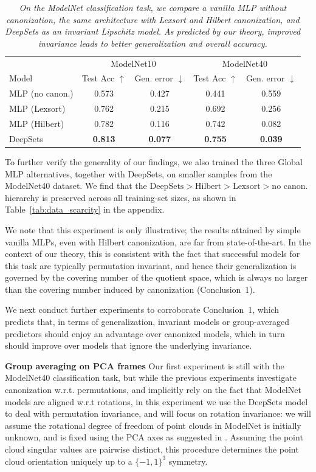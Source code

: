 \begin{table}[h]
\centering
\caption{\it On the ModelNet classification task, we compare a vanilla MLP without canonization, the same architecture with Lexsort and Hilbert canonization, and DeepSets as an invariant Lipschitz model. As predicted by our theory, improved invariance leads to better generalization and overall accuracy.}
\label{tab:best_modelnet10and40}
\begin{tabular}{lcccc}
\hline
 & \multicolumn{2}{c}{ModelNet10} & \multicolumn{2}{c}{ModelNet40} \\
Model & Test Acc $\uparrow$ & Gen. error $\downarrow$ & Test Acc $\uparrow$ & Gen. error $\downarrow$ \\
\hline
MLP (no canon.) & 0.573 & 0.427 & 0.441 & 0.559 \\
MLP (Lexsort)   & 0.762 & 0.215 & 0.692 & 0.256 \\
MLP (Hilbert)   & 0.782 & 0.116 & 0.742 & 0.082 \\
DeepSets        & \textbf{0.813} & \textbf{0.077} & \textbf{0.755} & \textbf{0.039} \\
\hline
\end{tabular}
\end{table}

To further verify the generality of our findings, we also trained the three Global MLP alternatives, together with DeepSets, on smaller samples from the ModelNet40 dataset. We find that the $\text{DeepSets}>\text{Hilbert}>\text{Lexsort}>\text{no canon.}$ hierarchy is preserved across all training-set sizes, as shown in Table~\ref{tab:data_scarcity} in the appendix.

We note that this experiment is only illustrative; the results attained by simple vanilla MLPs, even with Hilbert canonization, are far from state-of-the-art. In the context of our theory, this is consistent with the fact that successful models for this task are typically permutation invariant, and hence their generalization is governed by the covering number of the quotient space, which is always no larger than the covering number induced by canonization (Conclusion~1).

We next conduct further experiments to corroborate Conclusion~1, which predicts that, in terms of generalization, invariant models or group-averaged predictors should enjoy an advantage over canonized models, which in turn should improve over models that ignore the underlying invariance.

\textbf{Group averaging on PCA frames} Our first experiment is still with the ModelNet40 classification task, but while the previous experiments investigate canonization w.r.t. permutations, and implicitly rely on the fact that ModelNet models are aligned w.r.t rotations, in this experiment we use the  DeepSets \cite{zaheer2017deep} model to deal with permutation invariance, and will focus on rotation invariance: we will assume the rotational degree of freedom of point clouds in ModelNet is initially unknown, and is fixed using the PCA axes as suggested in \cite{punyframe}. Assuming the point cloud singular values are pairwise distinct, this procedure determines the point cloud orientation uniquely up to a $\{-1,1\}^3$ symmetry.

